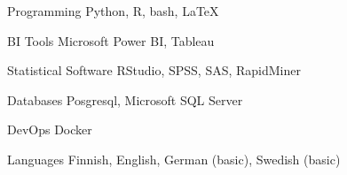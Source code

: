 

\begin{cvskills}

  \cvskill
    {Programming} %
    {Python, R, bash, LaTeX} %

  \cvskill
    {BI Tools} %
    {Microsoft Power BI, Tableau} %

  \cvskill
    {Statistical Software} %
    {RStudio, SPSS, SAS, RapidMiner} %

  \cvskill
    {Databases} %
    {Posgresql, Microsoft SQL Server} %

  \cvskill
    {DevOps} %
    {Docker} %

  \cvskill
    {Languages} %
    {Finnish, English, German (basic), Swedish (basic)} %

\end{cvskills}
